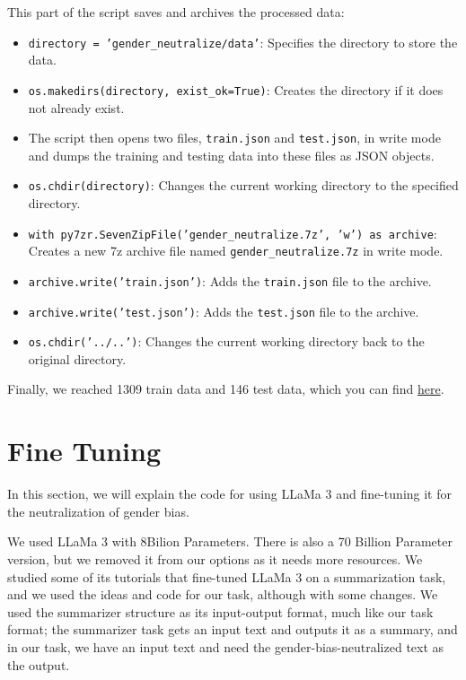\documentclass{solutionclass} %
\begin{document}
\begin{solution}
This part of the script saves and archives the processed data:

\begin{itemize}
	\item \texttt{directory = 'gender\_neutralize/data'}: Specifies the directory to store the data.
	\item \texttt{os.makedirs(directory, exist\_ok=True)}: Creates the directory if it does not already exist.
	\item The script then opens two files, \texttt{train.json} and \texttt{test.json}, in write mode and dumps the training and testing data into these files as JSON objects.
	\item \texttt{os.chdir(directory)}: Changes the current working directory to the specified directory.
	\item \texttt{with py7zr.SevenZipFile('gender\_neutralize.7z', 'w') as archive}: Creates a new 7z archive file named \texttt{gender\_neutralize.7z} in write mode.
	\item \texttt{archive.write('train.json')}: Adds the \texttt{train.json} file to the archive.
	\item \texttt{archive.write('test.json')}: Adds the \texttt{test.json} file to the archive.
	\item \texttt{os.chdir('../..')}: Changes the current working directory back to the original directory.
\end{itemize}

Finally, we reached 1309 train data and 146 test data, which you can find \href{https://huggingface.co/datasets/AmirMohammadFakhimi/gender_neutralize/tree/main/data}{here}.
\end{solution}

\section{Fine Tuning}

In this section, we will explain the code for using LLaMa 3 and fine-tuning it for the neutralization of gender bias.

We used LLaMa 3 with 8Bilion Parameters. There is also a 70 Billion Parameter version, but we removed it from our options as it needs more resources. We studied some of its tutorials that fine-tuned LLaMa 3 on a summarization task, and we used the ideas and code for our task, although with some changes. We used the summarizer structure as its input-output format, much like our task format; the summarizer task gets an input text and outputs it as a summary, and in our task, we have an input text and need the gender-bias-neutralized text as the output.
\end{document}
